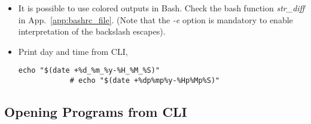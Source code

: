 \documentclass[12pt, a4paper]{article}
\numberwithin{equation}{section}
\theoremstyle{definition}
\theoremstyle{definition}
\begin{document}
\begin{itemize}
		\item It is possible to use colored outputs in Bash. Check the bash function \textit{str\_diff} in App.~\ref{app:bashrc_file}. (Note that the \textit{-e} option is mandatory to enable interpretation of the backslash escapes).
	
		\item Print day and time from CLI,
		
		\begin{lstlisting}[style=mystylebash, label=alg:cli_date, xleftmargin=\parindent]
			echo "$(date +%d_%m_%y-%H_%M_%S)"
			# echo "$(date +%dp%mp%y-%Hp%Mp%S)"
		\end{lstlisting}
		
	\end{itemize}
	
	\subsection{Opening Programs from CLI}
	
\end{document}
